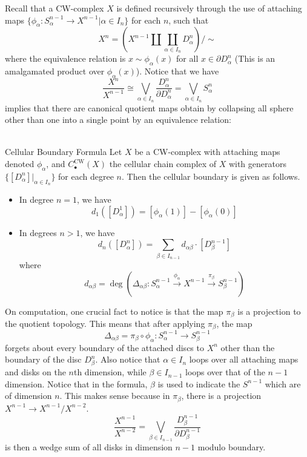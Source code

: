 \documentclass[a4paper]{article}
\begin{document}
Recall that a CW-complex $X$ is defined recursively through the use of attaching maps $\{\phi_\alpha:S_\alpha^{n-1}\to X^{n-1}|\alpha\in I_n\}$ for each $n$, such that $$X^n=\left(X^{n-1}\amalg\coprod_{\alpha\in I_n}D_\alpha^n\right)/\sim$$ where the equivalence relation is $x\sim\phi_\alpha(x)$ for all $x\in\partial D_\alpha^n$ (This is an amalgamated product over $\phi_\alpha(x)$). Notice that we have $$\frac{X^n}{X^{n-1}}\cong\bigvee_{\alpha\in I_n}\frac{D_\alpha^n}{\partial D_\alpha^n}=\bigvee_{\alpha\in I_n} S_\alpha^n$$ implies that there are canonical quotient maps obtain by collapsing all sphere other than one into a single point by an equivalence relation: \\
 \\

\begin{thm}{Cellular Boundary Formula}{} Let $X$ be a CW-complex with attaching maps denoted $\phi_\alpha$, and $C_\bullet^\text{CW}(X)$ the cellular chain complex of $X$ with generators $\{[D_\alpha^n]|_{\alpha\in I_n}\}$ for each degree $n$. Then the cellular boundary is given as follows. 
\begin{itemize}
\item In degree $n=1$, we have $$d_1\left([D_\alpha^1]\right)=[\phi_\alpha(1)]-[\phi_\alpha(0)]$$
\item In degrees $n>1$, we have $$d_n\left([D_\alpha^n]\right)=\sum_{\beta\in I_{n-1}}d_{\alpha\beta}\cdot[D_\beta^{n-1}]$$ where $$d_{\alpha\beta}=\deg\left(\Delta_{\alpha\beta}:S_\alpha^{n-1}\overset{\phi_\alpha}{\rightarrow}X^{n-1}\overset{\pi_\beta}{\rightarrow}S_\beta^{n-1}\right)$$ 
\end{itemize}
\end{thm}

On computation, one crucial fact to notice is that the map $\pi_\beta$ is a projection to the quotient topology. This means that after applying $\pi_\beta$, the map $$\Delta_{\alpha\beta}=\pi_\beta\circ\phi_\alpha:S_\alpha^{n-1}\to S_\beta^{n-1}$$ forgets about every boundary of the attached discs to $X^n$ other than the boundary of the disc $D_\beta^n$. Also notice that $\alpha\in I_n$ loops over all attaching maps and disks on the $n$th dimension, while $\beta\in I_{n-1}$ loops over that of the $n-1$ dimension. Notice that in the formula, $\beta$ is used to indicate the $S^{n-1}$ which are of dimension $n$. This makes sense because in $\pi_\beta$, there is a projection $X^{n-1}\to X^{n-1}/X^{n-2}$. $$\frac{X^{n-1}}{X^{n-2}}=\bigvee_{\beta\in I_{n-1}}\frac{D_\beta^{n-1}}{\partial D_\beta^{n-1}}$$ is then a wedge sum of all disks in dimension $n-1$ modulo boundary. 
\end{document}
